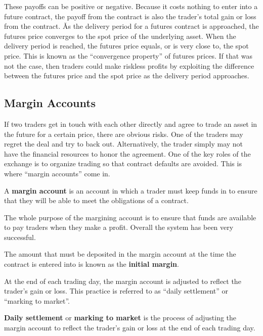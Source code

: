 These payoffs can be positive or negative. Because it costs nothing to enter into a future contract, the payoff from
the contract is also the trader's total gain or loss from the contract. \v

As the delivery period for a futures contract is approached, the futures price converges to the spot price of the
underlying asset. When the delivery period is reached, the futures price equals, or is very close to, the spot price.
This is known as the ``convergence property'' of futures prices. If that was not the case, then traders could make
riskless profits by exploiting the difference between the futures price and the spot price as the delivery period
approaches.


\subsection{Margin Accounts}

If two traders get in touch with each other directly and agree to trade an asset in the future for a certain price,
there are obvious risks. One of the traders may regret the deal and try to back out. Alternatively, the trader
simply may not have the financial resources to honor the agreement. One of the key roles of the exchange is to
organize trading so that contract defaults are avoided. This is where ``margin accounts'' come in.

A \textbf{margin account} is an account in which a trader must keep funds in to ensure that they will be able to meet
the obligations of a contract.
\ed

The whole purpose of the margining account is to ensure that funds are available to pay traders when they make a
profit. Overall the system has been very successful.

The amount that must be deposited in the margin account at the time the contract is entered into is known as the
\textbf{initial margin}.
\ed

At the end of each trading day, the margin account is adjusted to reflect the trader's gain or loss. This practice is
referred to as ``daily settlement'' or ``marking to market''.

\textbf{Daily settlement} or \textbf{marking to market} is the process of adjusting the margin account to reflect the
trader's gain or loss at the end of each trading day.
\ed

